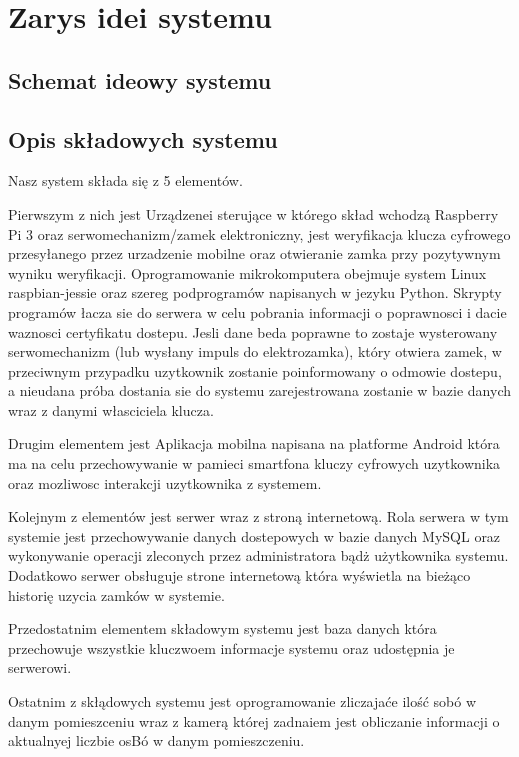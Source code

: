 % 
\newpage\section{Zarys idei systemu \textsl{\NazwaSys}}\label{sec:ideasystemu}
\subsection{Schemat ideowy systemu \textsl{\NazwaSys}}

\subsection{Opis składowych systemu}
Nasz system składa się z 5 elementów.

Pierwszym z nich jest Urządzenei sterujące  w którego skład wchodzą  Raspberry
Pi 3 oraz serwomechanizm/zamek elektroniczny, jest weryfikacja klucza cyfrowego
przesyłanego przez urzadzenie mobilne oraz otwieranie zamka przy pozytywnym
wyniku weryfikacji.
Oprogramowanie mikrokomputera obejmuje system Linux raspbian-jessie oraz
szereg podprogramów napisanych w jezyku Python. Skrypty programów łacza sie
do serwera w celu pobrania informacji o poprawnosci i dacie waznosci certyfikatu
dostepu. Jesli dane beda poprawne to zostaje wysterowany serwomechanizm (lub
wysłany impuls do elektrozamka), który otwiera zamek, w przeciwnym przypadku
uzytkownik zostanie poinformowany o odmowie dostepu, a nieudana próba dostania
sie do systemu zarejestrowana zostanie w bazie danych wraz z danymi własciciela
klucza.

Drugim elementem jest 
Aplikacja mobilna napisana na platforme Android która ma na celu
przechowywanie w pamieci smartfona kluczy cyfrowych uzytkownika oraz mozliwosc
interakcji uzytkownika z systemem.

Kolejnym z elementów jest serwer wraz z stroną internetową.
Rola serwera w tym systemie jest przechowywanie danych dostepowych w
bazie danych MySQL oraz wykonywanie operacji zleconych przez administratora bądż użytkownika systemu. Dodatkowo serwer obsługuje strone internetową która wyświetla na bieżąco historię uzycia zamków w systemie.

Przedostatnim elementem składowym systemu jest baza danych która przechowuje wszystkie kluczwoem informacje systemu oraz udostępnia je serwerowi.

Ostatnim z skłądowych systemu jest oprogramowanie zliczajaće ilość sobó w danym pomieszceniu wraz z kamerą której zadnaiem jest obliczanie informacji o aktualnyej liczbie osBó w danym pomieszczeniu. 


